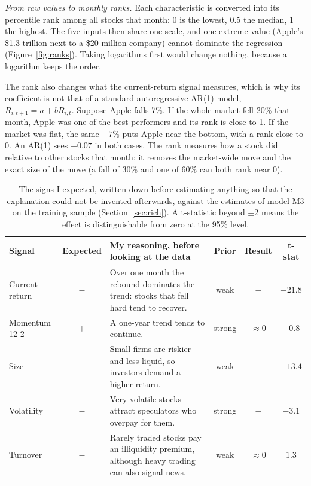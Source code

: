 \documentclass[10pt,a4paper]{article}
\begin{document}
\textit{From raw values to monthly ranks.} Each characteristic is converted into its percentile rank among all stocks
that month: 0 is the lowest, 0.5 the median, 1 the highest. The five inputs then share one scale, and one extreme
value (Apple's \$1.3 trillion next to a \$20 million company) cannot dominate the regression
(Figure~\ref{fig:ranks}). Taking logarithms first would change nothing, because a logarithm keeps the order.

The rank also changes what the current-return signal measures, which is why its coefficient is not that of a
standard autoregressive AR(1) model, $R_{i,t+1}=a+bR_{i,t}$. Suppose Apple falls 7\%. If the whole market fell 20\%
that month, Apple was one of the best performers and its rank is close to 1. If the market was flat, the same $-7\%$
puts Apple near the bottom, with a rank close to 0. An AR(1) sees $-0.07$ in both cases. The rank measures how a
stock did relative to other stocks that month; it removes the market-wide move and the exact size of the move (a
fall of 30\% and one of 60\% can both rank near 0).

\begin{table}[h]
\centering\small
\begin{tabular}{p{2.3cm}cp{7.6cm}ccc}
\toprule
Signal & Expected & My reasoning, before looking at the data & Prior & Result & t-stat \\
\midrule
Current return & $-$ & Over one month the rebound dominates the trend: stocks that fell hard tend to recover. & weak & $-$ & $-21.8$ \\
Momentum 12-2 & $+$ & A one-year trend tends to continue. & strong & $\approx 0$ & $-0.8$ \\
Size & $-$ & Small firms are riskier and less liquid, so investors demand a higher return. & weak & $-$ & $-13.4$ \\
Volatility & $-$ & Very volatile stocks attract speculators who overpay for them. & strong & $-$ & $-3.1$ \\
Turnover & $-$ & Rarely traded stocks pay an illiquidity premium, although heavy trading can also signal news. & weak & $\approx 0$ & $1.3$ \\
\bottomrule
\end{tabular}
\caption{The signs I expected, written down before estimating anything so that the explanation could not be
invented afterwards, against the estimates of model M3 on the training sample (Section~\ref{sec:rich}).
A t-statistic beyond $\pm 2$ means the effect is distinguishable from zero at the 95\% level.}
\label{tab:hyp}
\end{table}
\end{document}
